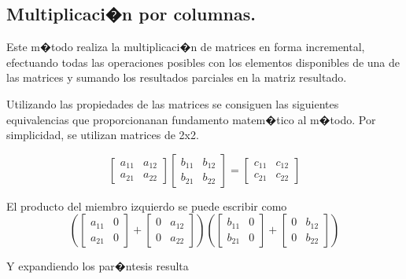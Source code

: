 \documentclass{article}
\begin{document}
\subsection{Multiplicaci�n por columnas.}

Este m�todo realiza la multiplicaci�n de matrices en forma incremental, efectuando todas las operaciones posibles con los elementos disponibles de una de las matrices y sumando los resultados parciales en la matriz resultado.

Utilizando las propiedades de las matrices se consiguen las siguientes equivalencias que proporcionanan fundamento matem�tico al m�todo. Por simplicidad, se utilizan matrices de 2x2.

$$
  \left[
	\begin{array}{cc}
		a_{11} & a_{12} \\
		a_{21} & a_{22}
	\end{array}
   \right]
   \left[
	\begin{array}{cc}
		b_{11} & b_{12} \\
		b_{21} & b_{22}
	\end{array}
   \right]
   =
   \left[
	\begin{array}{cc}
		c_{11} & c_{12} \\
		c_{21} & c_{22}
	\end{array}
   \right]
$$

El producto del miembro izquierdo se puede escribir como
$$
   \left(
	\left[
	\begin{array}{cc}
		a_{11} & 0 \\
		a_{21} & 0
	\end{array}
	\right]
        +
	\left[
	\begin{array}{cc}
		0 & a_{12} \\
		0 & a_{22}
	\end{array}
	\right]
   \right)
   \left(
   	\left[
	\begin{array}{cc}
		b_{11} & 0 \\
		b_{21} & 0
	\end{array}
	\right]
        +
	\left[
	\begin{array}{cc}
		0 & b_{12} \\
		0 & b_{22}
	\end{array}
	\right]
   \right)
$$

Y expandiendo los par�ntesis resulta
\end{document}
